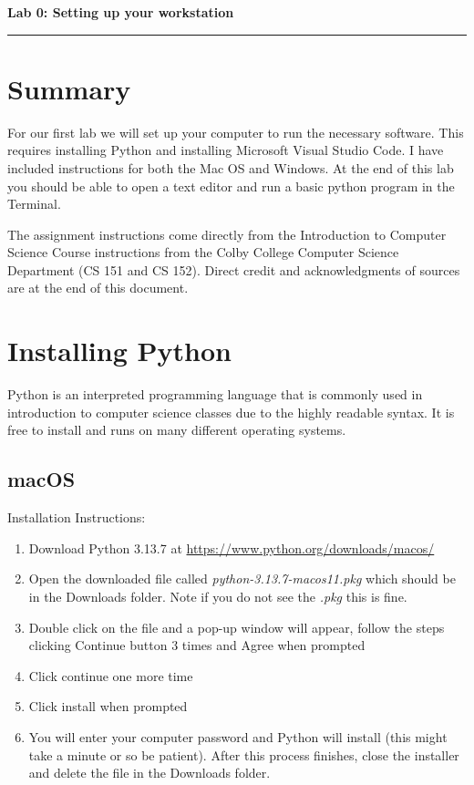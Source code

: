 \documentclass[12pt]{article}
\begin{document}
\begin{center}
  {\Large {\bf Lab 0: Setting up your workstation}}
  
\end{center}

\vspace{5pt}
\hrule
\vspace{5pt}

\section{Summary}
For our first lab we will set up your computer to run the necessary software. 
This requires installing Python and installing Microsoft Visual Studio Code.
I have included instructions for both the Mac OS and Windows. 
At the end of this lab you should be able to open a text editor and run a basic python program in the Terminal.

The assignment instructions come directly from the Introduction to Computer Science Course instructions from the Colby College Computer Science Department (CS 151 and CS 152).
Direct credit and acknowledgments of sources are at the end of this document. 

\section{Installing Python}
Python is an interpreted programming language that is commonly used in introduction to computer science classes due to the highly readable syntax.
It is free to install and runs on many different operating systems. 

\subsection{macOS}
Installation Instructions: 
\begin{enumerate}
\item Download Python 3.13.7 at \url{https://www.python.org/downloads/macos/}
\item Open the downloaded file called \textit{python-3.13.7-macos11.pkg} which should be in the Downloads folder. Note if you do not see the \textit{.pkg} this is fine. 
\item Double click on the file and a pop-up window will appear, follow the steps clicking Continue button 3 times and Agree when prompted
\item Click continue one more time
\item Click install when prompted
\item You will enter your computer password and Python will install (this might take a minute or so be patient). After this process finishes, close the installer and delete the file in the Downloads folder.
\end{enumerate}
\end{document}
